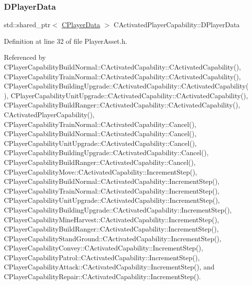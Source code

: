 \subsubsection{\texorpdfstring{D\+Player\+Data}{DPlayerData}}
{\footnotesize\ttfamily std\+::shared\+\_\+ptr$<$ \hyperlink{classCPlayerData}{C\+Player\+Data} $>$ C\+Activated\+Player\+Capability\+::\+D\+Player\+Data\hspace{0.3cm}{\ttfamily [protected]}}



Definition at line 32 of file Player\+Asset.\+h.



Referenced by C\+Player\+Capability\+Build\+Normal\+::\+C\+Activated\+Capability\+::\+C\+Activated\+Capability(), C\+Player\+Capability\+Train\+Normal\+::\+C\+Activated\+Capability\+::\+C\+Activated\+Capability(), C\+Player\+Capability\+Building\+Upgrade\+::\+C\+Activated\+Capability\+::\+C\+Activated\+Capability(), C\+Player\+Capability\+Unit\+Upgrade\+::\+C\+Activated\+Capability\+::\+C\+Activated\+Capability(), C\+Player\+Capability\+Build\+Ranger\+::\+C\+Activated\+Capability\+::\+C\+Activated\+Capability(), C\+Activated\+Player\+Capability(), C\+Player\+Capability\+Train\+Normal\+::\+C\+Activated\+Capability\+::\+Cancel(), C\+Player\+Capability\+Build\+Normal\+::\+C\+Activated\+Capability\+::\+Cancel(), C\+Player\+Capability\+Unit\+Upgrade\+::\+C\+Activated\+Capability\+::\+Cancel(), C\+Player\+Capability\+Building\+Upgrade\+::\+C\+Activated\+Capability\+::\+Cancel(), C\+Player\+Capability\+Build\+Ranger\+::\+C\+Activated\+Capability\+::\+Cancel(), C\+Player\+Capability\+Move\+::\+C\+Activated\+Capability\+::\+Increment\+Step(), C\+Player\+Capability\+Build\+Normal\+::\+C\+Activated\+Capability\+::\+Increment\+Step(), C\+Player\+Capability\+Train\+Normal\+::\+C\+Activated\+Capability\+::\+Increment\+Step(), C\+Player\+Capability\+Unit\+Upgrade\+::\+C\+Activated\+Capability\+::\+Increment\+Step(), C\+Player\+Capability\+Building\+Upgrade\+::\+C\+Activated\+Capability\+::\+Increment\+Step(), C\+Player\+Capability\+Mine\+Harvest\+::\+C\+Activated\+Capability\+::\+Increment\+Step(), C\+Player\+Capability\+Build\+Ranger\+::\+C\+Activated\+Capability\+::\+Increment\+Step(), C\+Player\+Capability\+Stand\+Ground\+::\+C\+Activated\+Capability\+::\+Increment\+Step(), C\+Player\+Capability\+Convey\+::\+C\+Activated\+Capability\+::\+Increment\+Step(), C\+Player\+Capability\+Patrol\+::\+C\+Activated\+Capability\+::\+Increment\+Step(), C\+Player\+Capability\+Attack\+::\+C\+Activated\+Capability\+::\+Increment\+Step(), and C\+Player\+Capability\+Repair\+::\+C\+Activated\+Capability\+::\+Increment\+Step().

